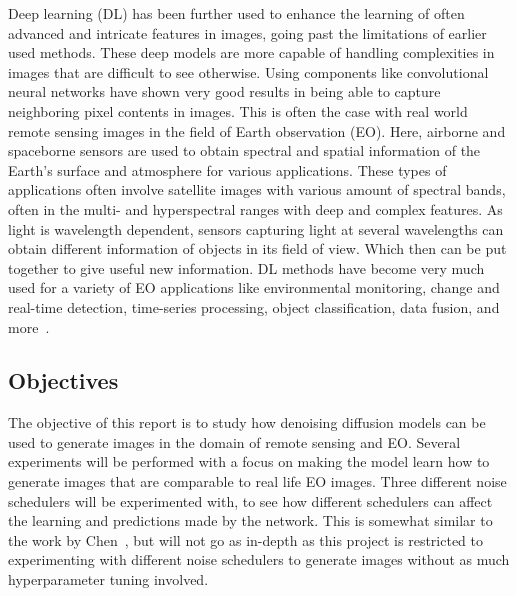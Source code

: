 \documentclass[fullpaper]{nldl}
\begin{document}
Deep learning (DL) has been further used to enhance the learning of often advanced and intricate features in images, going past the limitations of earlier used methods. These deep models are more capable of handling complexities in images that are difficult to see otherwise. Using components like convolutional neural networks have shown very good results in being able to capture neighboring pixel contents in images. This is often the case with real world remote sensing images in the field of Earth observation (EO). Here, airborne and spaceborne sensors are used to obtain spectral and spatial information of the Earth's surface and atmosphere \cite{zhu2018review} for various applications. These types of applications often involve satellite images with various amount of spectral bands, often in the multi- and hyperspectral ranges with deep and complex features. As light is wavelength dependent, sensors capturing light at several wavelengths can obtain different information of objects in its field of view. Which then can be put together to give useful new information. DL methods have become very much used for a variety of EO applications like environmental monitoring, change and real-time detection, time-series processing, object classification, data fusion, and more~\cite{chen2023special}. 


\subsection{Objectives}
\label{subsect:Objectives}
The objective of this report is to study how denoising diffusion models can be used to generate images in the domain of remote sensing and EO. Several experiments will be performed with a focus on making the model learn how to generate images that are comparable to real life EO images. Three different noise schedulers will be experimented with, to see how different schedulers can affect the learning and predictions made by the network. This is somewhat similar to the work by Chen~\cite{chen2023importance}, but will not go as in-depth as this project is restricted to experimenting with different noise schedulers to generate images without as much hyperparameter tuning involved. 
\end{document}
